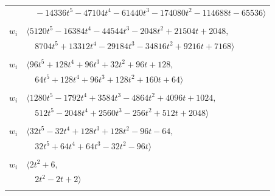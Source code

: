 \documentclass[11pt]{article}
\begin{document}
\begin{longtable}{@{}ll@{}}
 & $\quad -14336t^{5}-47104t^{4}-61440t^{3}-174080t^{2}-114688t-65536\rangle$\\
\addlinespace[2pt]
\multicolumn{2}{@{}p{0.97\textwidth}@{}}{$i=11$, $D_i=512$, $\rho_{ij}$: $3{:}2, \allowbreak 7{:}1, \allowbreak 10{:}1, \allowbreak 20{:}2, \allowbreak 24{:}1, \allowbreak 26{:}1, \allowbreak 29{:}1, \allowbreak 35{:}1, \allowbreak 36{:}2, \allowbreak 40{:}2$}\\
$w_i$ & $\langle 5120t^{5}-16384t^{4}-44544t^{3}-2048t^{2}+21504t+2048,$\\
 & $\quad 8704t^{5}+13312t^{4}-29184t^{3}-34816t^{2}+9216t+7168\rangle$\\
\addlinespace[2pt]
\multicolumn{2}{@{}p{0.97\textwidth}@{}}{$i=12$, $D_i=32$, $\rho_{ij}$: $1{:}1, \allowbreak 6{:}2, \allowbreak 29{:}2, \allowbreak 31{:}2, \allowbreak 35{:}2, \allowbreak 37{:}2$}\\
$w_i$ & $\langle 96t^{5}+128t^{4}+96t^{3}+32t^{2}+96t+128,$\\
 & $\quad 64t^{5}+128t^{4}+96t^{3}+128t^{2}+160t+64\rangle$\\
\addlinespace[2pt]
\multicolumn{2}{@{}p{0.97\textwidth}@{}}{$i=13$, $D_i=256$, $\rho_{ij}$: $7{:}2, \allowbreak 10{:}2, \allowbreak 14{:}2, \allowbreak 19{:}2, \allowbreak 25{:}1, \allowbreak 30{:}2, \allowbreak 31{:}2$}\\
$w_i$ & $\langle 1280t^{5}-1792t^{4}+3584t^{3}-4864t^{2}+4096t+1024,$\\
 & $\quad 512t^{5}-2048t^{4}+2560t^{3}-256t^{2}+512t+2048\rangle$\\
\addlinespace[2pt]
\multicolumn{2}{@{}p{0.97\textwidth}@{}}{$i=14$, $D_i=32$, $\rho_{ij}$: $0{:}1, \allowbreak 1{:}2, \allowbreak 6{:}1, \allowbreak 9{:}1, \allowbreak 13{:}1, \allowbreak 39{:}2, \allowbreak 41{:}2$}\\
$w_i$ & $\langle 32t^{5}-32t^{4}+128t^{3}+128t^{2}-96t-64,$\\
 & $\quad 32t^{5}+64t^{4}+64t^{3}-32t^{2}-96t\rangle$\\
\addlinespace[2pt]
\multicolumn{2}{@{}p{0.97\textwidth}@{}}{$i=15$, $D_i=2$, $\rho_{ij}$: $1{:}2, \allowbreak 7{:}1, \allowbreak 24{:}1, \allowbreak 34{:}1, \allowbreak 36{:}2, \allowbreak 39{:}1$}\\
$w_i$ & $\langle 2t^{2}+6,$\\
 & $\quad 2t^{2}-2t+2\rangle$\\
\addlinespace[2pt]
\multicolumn{2}{@{}p{0.97\textwidth}@{}}{$i=16$, $D_i=4$, $\rho_{ij}$: $0{:}2, \allowbreak 9{:}2, \allowbreak 20{:}1, \allowbreak 21{:}2, \allowbreak 22{:}2, \allowbreak 29{:}2, \allowbreak 33{:}2, \allowbreak 34{:}2, \allowbreak 37{:}2$}\\

\end{longtable}
\end{document}
